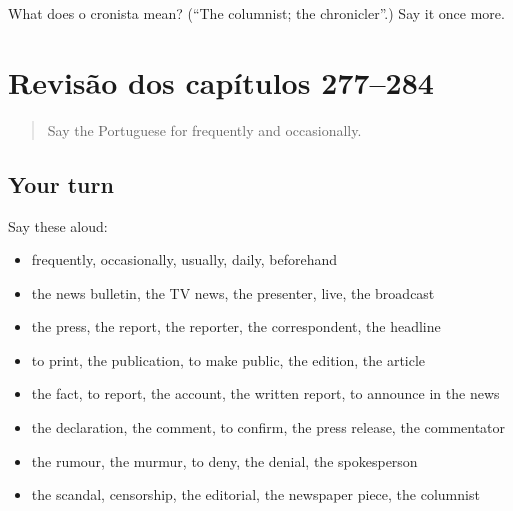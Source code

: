 \begin{tcolorbox}[breakable,colback=teal!4,colframe=teal!35!black,title={Before you move on}]
What does o cronista mean? (\textquotedblleft{}The columnist; the chronicler\textquotedblright{}.) Say it once more.
\end{tcolorbox}
\section[(dialogue)]{Revisão dos capítulos 277–284}

\label{lesson:PT-R284-revisao-277-284}



\begin{quote}
Say the Portuguese for frequently and occasionally.
\end{quote}

\subsection*{Your turn}
Say these aloud:

\begin{itemize}
\raggedright
  \item frequently, occasionally, usually, daily, beforehand
  \item the news bulletin, the TV news, the presenter, live, the broadcast
  \item the press, the report, the reporter, the correspondent, the headline
  \item to print, the publication, to make public, the edition, the article
  \item the fact, to report, the account, the written report, to announce in the news
  \item the declaration, the comment, to confirm, the press release, the commentator
  \item the rumour, the murmur, to deny, the denial, the spokesperson
  \item the scandal, censorship, the editorial, the newspaper piece, the columnist
\end{itemize}


